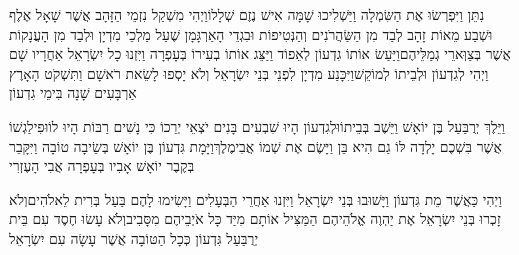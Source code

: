 \documentclass[../main/main.tex]{subfiles}
\begin{document}
\begin{multicols*}{\ncols}
נִתֵּן וַיִּפְרְשׂוּ אֶת הַשִּׂמְלָה וַיַּשְׁלִיכוּ שָׁמָּה אִישׁ נֶזֶם שְׁלָלוֹ\PreVerseSpace{}וַיְהִי מִשְׁקַל נִזְמֵי הַזָּהָב אֲשֶׁר שָׁאָל אֶלֶף וּשְׁבַע מֵאוֹת זָהָב לְבַד מִן הַשַּׂהֲרֹנִים וְהַנְּטִיפוֹת וּבִגְדֵי הָאַרְגָּמָן שֶׁעַל מַלְכֵי מִדְיָן וּלְבַד מִן הָעֲנָקוֹת אֲשֶׁר בְּצַוְּארֵי גְמַלֵּיהֶם\PreVerseSpace{}וַיַּעַשׂ אוֹתוֹ גִדְעוֹן לְאֵפוֹד וַיַּצֵּג אוֹתוֹ בְעִירוֹ בְּעָפְרָה וַיִּזְנוּ כָל יִשְׂרָאֵל אַחֲרָיו שָׁם וַיְהִי לְגִדְעוֹן וּלְבֵיתוֹ לְמוֹקֵשׁ\PreVerseSpace{}וַיִּכָּנַע מִדְיָן לִפְנֵי בְּנֵי יִשְׂרָאֵל וְלֹא יָסְפוּ לָשֵׂאת רֹאשָׁם וַתִּשְׁקֹט הָאָרֶץ אַרְבָּעִים שָׁנָה בִּימֵי גִדְעוֹן\OpenSection{}\par
{}וַיֵּלֶךְ יְרֻבַּעַל בֶּן יוֹאָשׁ וַיֵּשֶׁב בְּבֵיתוֹ\PreVerseSpace{}וּלְגִדְעוֹן הָיוּ שִׁבְעִים בָּנִים יֹצְאֵי יְרֵכוֹ כִּי נָשִׁים רַבּוֹת הָיוּ לוֹ\PreVerseSpace{}וּפִילַגְשׁוֹ אֲשֶׁר בִּשְׁכֶם יָלְדָה לּוֹ גַם הִיא בֵּן וַיָּשֶׂם אֶת שְׁמוֹ אֲבִימֶלֶךְ\PreVerseSpace{}וַיָּמָת גִּדְעוֹן בֶּן יוֹאָשׁ בְּשֵׂיבָה טוֹבָה וַיִּקָּבֵר בְּקֶבֶר יוֹאָשׁ אָבִיו בְּעָפְרָה אֲבִי הָעֶזְרִי\OpenSection{}\par
{}וַיְהִי כַּאֲשֶׁר מֵת גִּדְעוֹן וַיָּשׁוּבוּ בְּנֵי יִשְׂרָאֵל וַיִּזְנוּ אַחֲרֵי הַבְּעָלִים וַיָּשִׂימוּ לָהֶם בַּעַל בְּרִית לֵאלֹהִים\PreVerseSpace{}וְלֹא זָכְרוּ בְּנֵי יִשְׂרָאֵל אֶת יַהְוֶה אֱלֹהֵיהֶם הַמַּצִּיל אוֹתָם מִיַּד כָּל אֹיְבֵיהֶם מִסָּבִיב\PreVerseSpace{}וְלֹא עָשׂוּ חֶסֶד עִם בֵּית יְרֻבַּעַל גִּדְעוֹן כְּכָל הַטּוֹבָה אֲשֶׁר עָשָׂה עִם יִשְׂרָאֵל\OpenSection{}\par

\end{multicols*}
\end{document}
